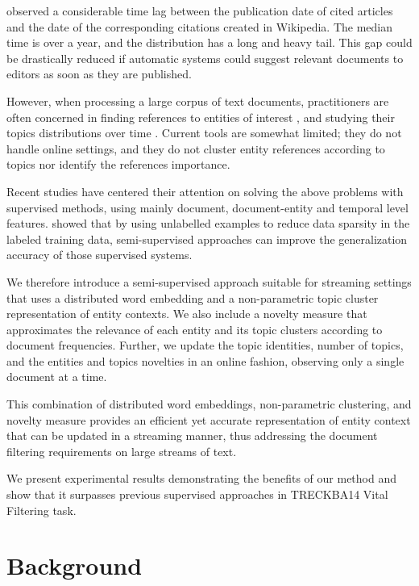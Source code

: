 \documentclass{article}
\begin{document}
\cite{frank12} observed a considerable time lag between the publication date of cited articles and the date of the corresponding citations created in Wikipedia. The median time is over a year, and the distribution has a long and heavy tail. This gap could be drastically reduced if automatic systems could suggest relevant documents to editors as soon as they are published.

However, when processing a large corpus of text documents, practitioners are often concerned in finding references to entities of interest \cite{RaoMD10, choi2007}, and studying their topics distributions over time \cite{blei12}. Current tools are somewhat limited; they do not handle online settings, and they do not cluster entity references according to topics nor identify the references importance.

Recent studies \cite{xitong13, bouvier13, efron13, zhang13, bellogin13} have centered their attention on solving the above problems with supervised methods, using mainly document, document-entity and temporal level features. \cite{Turian10wordrepresentations} showed that by using unlabelled examples to reduce data sparsity in the labeled training data, semi-supervised approaches can improve the generalization accuracy of those supervised systems.

We therefore introduce a semi-supervised approach suitable for streaming settings that uses a distributed word embedding and a non-parametric topic cluster representation of entity contexts. We also include a novelty measure that approximates the relevance of each entity and its topic clusters according to document frequencies. Further, we update the topic identities, number of topics, and the entities and topics novelties in an online fashion, observing only a single document at a time.

This combination of distributed word embeddings, non-parametric clustering, and novelty measure provides an efficient yet accurate representation of entity context that can be updated in a streaming manner, thus addressing the document filtering requirements on large streams of text.

We present experimental results demonstrating the benefits of our method and show that it surpasses previous supervised approaches in TRECKBA14 Vital Filtering task.

\section{Background}
\label{background}
\end{document}
